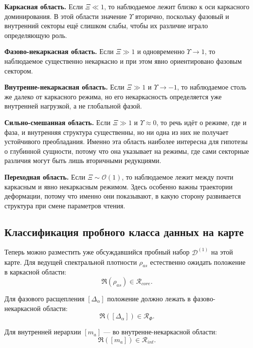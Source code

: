 \documentclass[12pt,a4paper]{article}
\begin{document}
\textbf{Каркасная область.} Если \(\Xi \ll 1\), то наблюдаемое лежит близко к оси каркасного доминирования. В этой области значение \(\Upsilon\) вторично, поскольку фазовый и внутренний секторы ещё слишком слабы, чтобы их различие играло определяющую роль.

\textbf{Фазово-некаркасная область.} Если \(\Xi \gg 1\) и одновременно \(\Upsilon \to 1\), то наблюдаемое существенно некаркасно и при этом явно ориентировано фазовым сектором.

\textbf{Внутренне-некаркасная область.} Если \(\Xi \gg 1\) и \(\Upsilon \to -1\), то наблюдаемое столь же далеко от каркасного режима, но его некаркасность определяется уже внутренней нагрузкой, а не глобальной фазой.

\textbf{Сильно-смешанная область.} Если \(\Xi \gg 1\) и \(\Upsilon \approx 0\), то речь идёт о режиме, где и фаза, и внутренняя структура существенны, но ни одна из них не получает устойчивого преобладания. Именно эта область наиболее интересна для гипотезы о глубинной сущности, потому что она указывает на режимы, где сами секторные различия могут быть лишь вторичными редукциями.

\textbf{Переходная область.} Если \(\Xi \sim \mathcal{O}(1)\), то наблюдаемое лежит между почти каркасным и явно некаркасным режимом. Здесь особенно важны траектории деформации, потому что именно они показывают, в какую сторону развивается структура при смене параметров чтения.

\subsection{Классификация пробного класса данных на карте}

Теперь можно разместить уже обсуждавшийся пробный набор \(\mathcal{D}^{(1)}\) на этой карте. Для ведущей спектральной плотности \(\rho_{as}\) естественно ожидать положение в каркасной области:
\begin{equation}
\mathfrak{R}(\rho_{as}) \in \mathcal{R}_{core}.
\end{equation}

Для фазового расщепления \([\Delta_{\alpha}]\) положение должно лежать в фазово-некаркасной области:
\begin{equation}
\mathfrak{R}([\Delta_{\alpha}]) \in \mathcal{R}_{\Phi}.
\end{equation}

Для внутренней иерархии \([m_a]\) --- во внутренне-некаркасной области:
\begin{equation}
\mathfrak{R}([m_a]) \in \mathcal{R}_{int}.
\end{equation}
\end{document}
